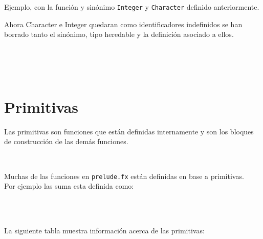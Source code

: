       Ejemplo, con la función y sinónimo \texttt{Integer} y \texttt{Character} definido anteriormente.
      
      \begin{fxcode}
      \end{fxcode}
      
      Ahora Character e Integer quedaran como identificadores indefinidos se han borrado tanto el sinónimo, tipo heredable y la definición asociado a ellos.
      
      \begin{fxcode}
         \\
         \\
         \\
      \end{fxcode}
      
   \section{Primitivas}
      Las primitivas son funciones que están definidas internamente y son los bloques de construcción de las demás funciones.
      
      \begin{fxcode}
         \\
      \end{fxcode}
      
      Muchas de las funciones en \texttt{prelude.fx} están definidas en base a primitivas.
      \\
      
      Por ejemplo las suma esta definida como:
      
      \begin{fxcode}
         \\
         \\
      \end{fxcode}
      
      La siguiente tabla muestra información acerca de las primitivas:
      
